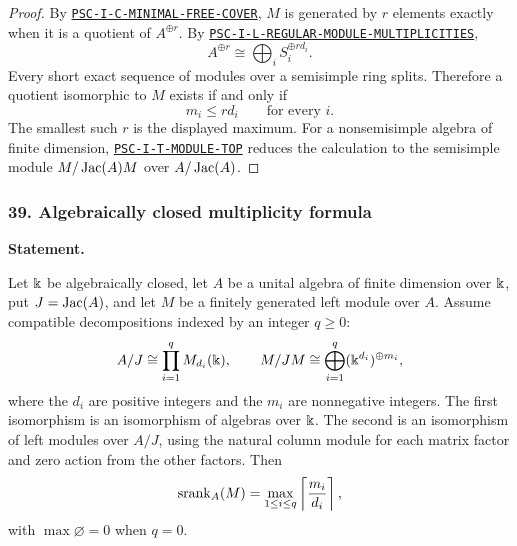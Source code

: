 \begin{proof}
By \hyperref[rec:PSC-I-C-MINIMAL-FREE-COVER]{\nolinkurl{PSC-I-C-MINIMAL-FREE-COVER}}, $M$ is generated by $r$ elements exactly when it is a quotient of $A^{\oplus r}$.  By \hyperref[rec:PSC-I-L-REGULAR-MODULE-MULTIPLICITIES]{\nolinkurl{PSC-I-L-REGULAR-MODULE-MULTIPLICITIES}},
\[
A^{\oplus r}\cong\bigoplus_iS_i^{\oplus rd_i}.
\]
Every short exact sequence of modules over a semisimple ring splits.  Therefore a quotient isomorphic to $M$ exists if and only if
\[
m_i\leq rd_i
\qquad\text{for every }i.
\]
The smallest such $r$ is the displayed maximum.  For a nonsemisimple algebra of finite dimension, \hyperref[rec:PSC-I-T-MODULE-TOP]{\nolinkurl{PSC-I-T-MODULE-TOP}} reduces the calculation to the semisimple module $M/\operatorname{Jac}(A)M$ over $A/\operatorname{Jac}(A)$.
\end{proof}
\subsubsection*{39. Algebraically closed multiplicity formula}
\label{rec:PSC-I-C-ALGEBRAICALLY-CLOSED-FORMULA}
\textbf{Statement.}\par
Let $\Bbbk$ be algebraically closed, let $A$ be a unital algebra of finite dimension over $\Bbbk$, put $J=\operatorname{Jac}(A)$, and let $M$ be a finitely generated left module over $A$.  Assume compatible decompositions indexed by an integer $q\geq0$:
\[
A/J\cong\prod_{i=1}^{q}M_{d_i}(\Bbbk),
\qquad
M/JM\cong\bigoplus_{i=1}^{q}(\Bbbk^{d_i})^{\oplus m_i},
\]
where the $d_i$ are positive integers and the $m_i$ are nonnegative integers.  The first isomorphism is an isomorphism of algebras over $\Bbbk$.  The second is an isomorphism of left modules over $A/J$, using the natural column module for each matrix factor and zero action from the other factors.  Then
\[
\operatorname{srank}_A(M)=\max_{1\leq i\leq q}\left\lceil\frac{m_i}{d_i}\right\rceil,
\]
with $\max\varnothing=0$ when $q=0$.

